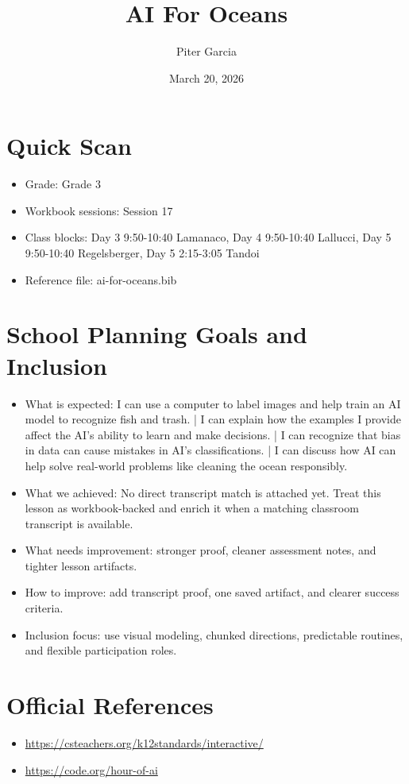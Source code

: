 \documentclass[11pt]{article}
\title{AI For Oceans}
\author{Piter Garcia}
\date{March 20, 2026}
\begin{document}
    \maketitle
    \section*{Quick Scan}
    \begin{itemize}[leftmargin=*]
    \item Grade: Grade 3
    \item Workbook sessions: Session 17
    \item Class blocks: Day 3 9:50-10:40 Lamanaco, Day 4 9:50-10:40 Lallucci, Day 5 9:50-10:40 Regelsberger, Day 5 2:15-3:05 Tandoi
    \item Reference file: ai-for-oceans.bib
    \end{itemize}
    \section*{School Planning Goals and Inclusion}
    \begin{itemize}[leftmargin=*]
    \item What is expected: I can use a computer to label images and help train an AI model to recognize fish and trash. | I can explain how the examples I provide affect the AI’s ability to learn and make decisions. | I can recognize that bias in data can cause mistakes in AI’s classifications. | I can discuss how AI can help solve real-world problems like cleaning the ocean responsibly.
    \item What we achieved: No direct transcript match is attached yet. Treat this lesson as workbook-backed and enrich it when a matching classroom transcript is available.
    \item What needs improvement: stronger proof, cleaner assessment notes, and tighter lesson artifacts.
    \item How to improve: add transcript proof, one saved artifact, and clearer success criteria.
    \item Inclusion focus: use visual modeling, chunked directions, predictable routines, and flexible participation roles.
    \end{itemize}
    \section*{Official References}
    \begin{itemize}[leftmargin=*]
    \item \url{https://csteachers.org/k12standards/interactive/}
\item \url{https://code.org/hour-of-ai}

    \end{itemize}
    
\end{document}

